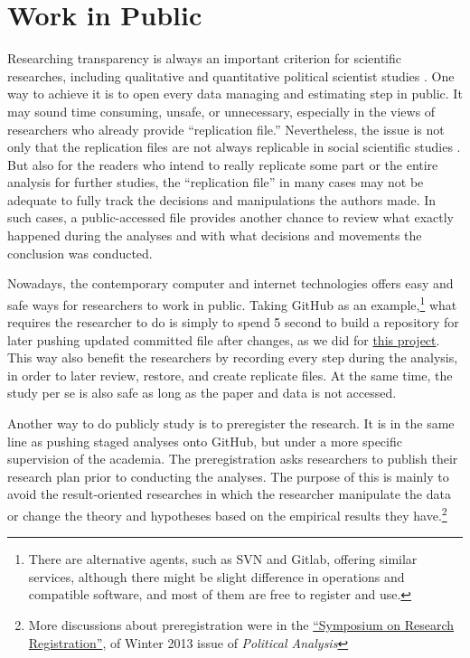 
\section{Work in Public}

Researching transparency is always an important criterion for scientific researches, including qualitative and quantitative political scientist studies \citep{Appadurai2000,Denzin2009}. One way to achieve it is to open every data managing and estimating step in public. It may sound time consuming, unsafe, or unnecessary, especially in the views of researchers who already provide ``replication file.'' Nevertheless, the issue is not only that the replication files are not always replicable in social scientific studies \citep{Chang2015,Jacoby2015,OpenScienceCollaboration2015}. But also for the readers who intend to really replicate some part or the entire analysis for further studies, the ``replication file'' in many cases may not be adequate to fully track the decisions and manipulations the authors made. In such cases, a public-accessed file provides another chance to review what exactly happened during the analyses and with what decisions and movements the conclusion was conducted. 

Nowadays, the contemporary computer and internet technologies offers easy and safe ways for researchers to work in public. Taking GitHub as an example,\footnote{There are alternative agents, such as SVN and Gitlab, offering similar services, although there might be slight difference in operations and compatible software, and most of them are free to register and use.} what requires the researcher to do is simply to spend 5 second to build a repository for later pushing updated committed file after changes, as we did for \href{https://github.com/fsolt/meritocracy-rep}{this project}. This way also benefit the researchers by recording every step during the analysis, in order to later review, restore, and create replicate files. At the same time, the study per se is also safe as long as the paper and data is not accessed. 

Another way to do publicly study is to preregister the research. It is in the same line as pushing staged analyses onto GitHub, but under a more specific supervision of the academia. The preregistration asks researchers to publish their research plan prior to conducting the analyses. The purpose of this is mainly to avoid the result-oriented researches in which the researcher manipulate the data or change the theory and hypotheses based on the empirical results they have.\footnote{More discussions about preregistration were in the \href{http://pan.oxfordjournals.org/content/21/1.toc}{``Symposium on Research Registration''}, of Winter 2013 issue of \textit{Political Analysis}}


